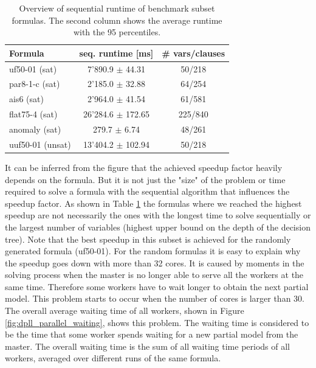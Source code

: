\documentclass[letterpaper]{article}
\begin{document}
\begin{table}[h]
    \centering
    \begin{tabular}{|l|c|c|}
        \hline
        Formula & seq. runtime [ms] & \# vars/clauses \\
        \hline
        \hline
        uf50-01 (sat) & 7'890.9 $\pm$ 44.31 & 50/218\\
        \hline
        par8-1-c (sat) & 2'185.0 $\pm$ 32.88 & 64/254\\
        \hline
        ais6 (sat) &  2'964.0 $\pm$ 41.54 & 61/581\\
        \hline
        flat75-4 (sat) & 26'284.6 $\pm$ 172.65 & 225/840\\
        \hline
        anomaly (sat) & 279.7 $\pm$ 6.74 & 48/261\\
        \hline
        uuf50-01 (unsat) & 13'404.2 $\pm$ 102.94 & 50/218\\
        \hline
    \end{tabular}
    \caption{Overview of sequential runtime of benchmark subset formulas.
    The second column shows the average runtime with the 95 percentiles.}
    \label{tab:cnfs_representatives}
\end{table}


It can be inferred from the figure that the achieved speedup factor heavily depends on the formula.
But it is not just the "size" of the problem or time required to solve a formula with the sequential algorithm that influences the speedup factor.
As shown in Table \ref{tab:cnfs_representatives} the formulas where we reached the highest speedup are not necessarily the ones with the longest time to solve sequentially or the largest number of variables (highest upper bound on the depth of the decision tree).
Note that the best speedup in this subset is achieved for the randomly generated formula (uf50-01).
For the random formulas it is easy to explain why the speedup goes down with more than 32 cores.
It is caused by moments in the solving process when the master is no longer able to serve all the workers at the same time.
Therefore some workers have to wait longer to obtain the next partial model.
This problem starts to occur when the number of cores is larger than 30.
The overall average waiting time of all workers, shown in Figure \ref{fig:dpll_parallel_waiting}, shows this problem.
The waiting time is considered to be the time that some worker spends waiting for a new partial model from the master.
The overall waiting time is the sum of all waiting time periods of all workers, averaged over different runs of the same formula.
\end{document}
